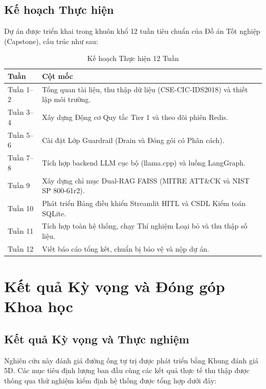 \documentclass[12pt,a4paper]{article}
\begin{document}
\subsection{Kế hoạch Thực hiện}
Dự án được triển khai trong khuôn khổ 12 tuần tiêu chuẩn của Đồ án Tốt nghiệp (Capstone), cấu trúc như sau:

\begin{table}[H]
    \centering
    \caption{Kế hoạch Thực hiện 12 Tuần}
    \label{tab:timeline}
    \begin{tabular}{lp{10cm}}
        \toprule
        \textbf{Tuần} & \textbf{Cột mốc} \\
        \midrule
        Tuần 1--2 & Tổng quan tài liệu, thu thập dữ liệu (CSE-CIC-IDS2018) và thiết lập môi trường. \\
        Tuần 3--4 & Xây dựng Động cơ Quy tắc Tier 1 và theo dõi phiên Redis. \\
        Tuần 5--6 & Cài đặt Lớp Guardrail (Drain và Đóng gói có Phân cách). \\
        Tuần 7--8 & Tích hợp backend LLM cục bộ (llama.cpp) và luồng LangGraph. \\
        Tuần 9 & Xây dựng chỉ mục Dual-RAG FAISS (MITRE ATT\&CK và NIST SP 800-61r2). \\
        Tuần 10 & Phát triển Bảng điều khiển Streamlit HITL và CSDL Kiểm toán SQLite. \\
        Tuần 11 & Tích hợp toàn hệ thống, chạy Thí nghiệm Loại bỏ và thu thập số liệu. \\
        Tuần 12 & Viết báo cáo tổng kết, chuẩn bị bảo vệ và nộp dự án. \\
        \bottomrule
    \end{tabular}
\end{table}

\newpage
\section{Kết quả Kỳ vọng và Đóng góp Khoa học}

\subsection{Kết quả Kỳ vọng và Thực nghiệm}
Nghiên cứu này đánh giá đường ống tự trị được phát triển bằng Khung đánh giá 5D. Các mục tiêu định lượng ban đầu cùng các kết quả thực tế thu thập được thông qua thử nghiệm kiểm định hệ thống được tổng hợp dưới đây:
\end{document}
